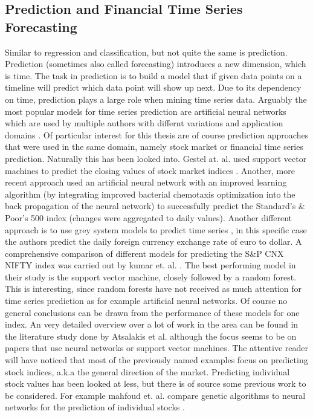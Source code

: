 \subsection{Prediction and Financial Time Series Forecasting}
\label{subsec_prediction}
Similar to regression and classification, but not quite the same is prediction. Prediction (sometimes also called forecasting) introduces a new dimension, which is time. The task in prediction is to build a model that if given data points on a timeline will predict which data point will show up next.
Due to its dependency on time, prediction plays a large role when mining time series data. Arguably the most popular models for time series prediction are artificial neural networks which are used by multiple authors with differnt variations and application domains \cite{connor1994recurrent} \cite{martinetz1993neural} \cite{frank2001time}. Of particular interest for this thesis are of course prediction approaches that were used in the same domain, namely stock market or financial time series prediction. Naturally this has been looked into. Gestel at. al. used support vector machines to predict the closing values of stock market indices \cite{van2001financial}.%
Another, more recent approach used an artificial neural network with an improved learning algorithm (by integrating improved bacterial chemotaxis optimization into the back propagation of the neural network) to successfully predict the Standard’s \& Poor’s 500 index (changes were aggregated to daily values).
Another different approach is to use grey system models to predict time series \citep{kayacan2010grey}, in this specific case the authors predict the daily foreign currency exchange rate of euro to dollar. A comprehensive comparison of different models for predicting the S\&P CNX NIFTY index was carried out by kumar et. al. \citep{kumar2006forecasting}. The best performing model in their study is the support vector machine, closely followed by a random forest. This is interesting, since random forests have not received as much attention for time series prediction as for example artificial neural networks. Of course no general conclusions can be drawn from the performance of these models for one index. An very detailed overview over a lot of work in the area can be found in the literature study done by Atsalakis et al. \cite{atsalakis2009surveying} although the focus seems to be on papers that use neural networks or support vector machines.
The attentive reader will have noticed that most of the previously named examples focus on predicting stock indices, a.k.a the general direction of the market. Predicting individual stock values has been looked at less, but there is of source some previous work to be considered. For example mahfoud et. al. compare genetic algorithms to neural networks for the prediction of individual stocks \cite{mahfoud1996financial}.

